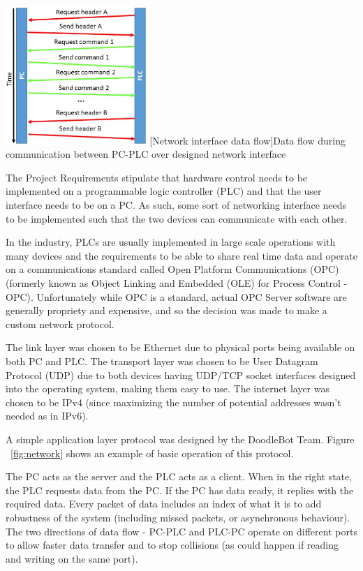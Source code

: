 \begin{center}
	\includegraphics[width=0.4\textwidth]{figures/systemDesign/network.JPG}
	[Network interface data flow]{Data flow during communication between PC-PLC over designed network interface}
	\label{fig:network}
\end{center}

The Project Requirements stipulate that hardware control needs to be implemented on a programmable logic controller (PLC) and that the user interface needs to be on a PC. As such, some sort of networking interface needs to be implemented such that the two devices can communicate with each other. 

In the industry, PLCs are usually implemented in large scale operations with many devices and the requirements to be able to share real time data and operate on a communications standard called Open Platform Communications (OPC) (formerly known as Object Linking and Embedded (OLE) for Process Control - OPC). Unfortunately while OPC is a standard, actual OPC Server software are generally propriety and expensive, and so the decision was made to make a custom network protocol.

The link layer was chosen to be Ethernet due to physical ports being available on both PC and PLC. The transport layer was chosen to be User Datagram Protocol (UDP) due to both devices having UDP/TCP socket interfaces designed into the operating system, making them easy to use. The internet layer was chosen to be IPv4 (since maximizing the number of potential addresses wasn't needed as in IPv6).

A simple application layer protocol was designed by the DoodleBot Team. Figure ~\ref{fig:network} shows an example of basic operation of this protocol. 

The PC acts as the server and the PLC acts as a client. When in the right state, the PLC requests data from the PC. If the PC has data ready, it replies with the required data. Every packet of data includes an index of what it is to add robustness of the system (including missed packets, or asynchronous behaviour). The two directions of data flow - PC-PLC and PLC-PC operate on different ports to allow faster data transfer and to stop collisions (as could happen if reading and writing on the same port).

